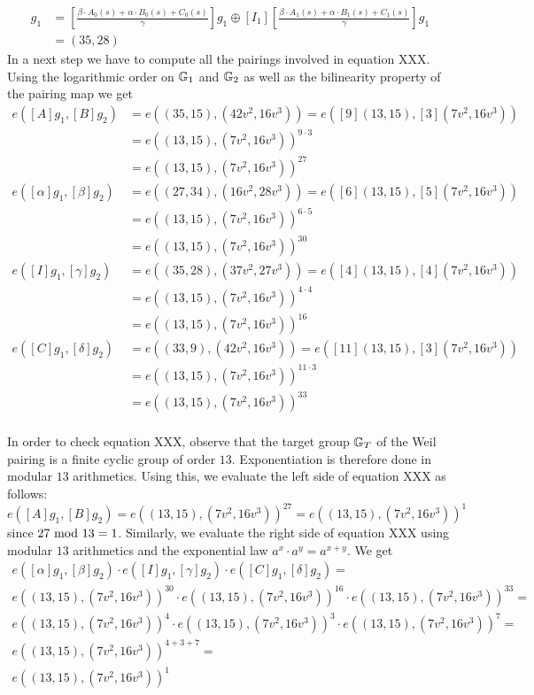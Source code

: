 \begin{example}
\begin{align*}
[I]g_1 & = [\frac{\beta\cdot A_{0}(s)+\alpha\cdot B_{0}(s)+C_{0}(s)}{\gamma}]g_1 \oplus [I_1][\frac{\beta\cdot A_{1}(s)+\alpha\cdot B_{1}(s)+C_{1}(s)}{\gamma}]g_1\\
       & = (35,28)
\end{align*} 
In a next step we have to compute all the pairings involved in equation XXX. Using the logarithmic order on $\mathbb{G}_1$ and $\mathbb{G}_2$ as well as the bilinearity property of the pairing map we get
\begin{align*}
e([A]g_1,[B]g_2) & = e((35,15),(42v^2,16v^3))
                   = e([9](13,15),[3](7v^2,16v^3))\\
               & = e((13,15),(7v^2,16v^3))^{9\cdot 3}\\ 
               & = e((13,15),(7v^2,16v^3))^{27}\\
e([\alpha]g_1,[\beta]g_2) & = e((27,34),(16v^2,28v^3)) 
                            = e([6](13,15),[5](7v^2,16v^3))\\
               & = e((13,15),(7v^2,16v^3))^{6\cdot 5}\\
               & = e((13,15),(7v^2,16v^3))^{30}\\   
e([I]g_1,[\gamma]g_2) & = e((35,28),(37v^2,27v^3)) 
                            = e([4](13,15),[4](7v^2,16v^3))\\
               & = e((13,15),(7v^2,16v^3))^{4\cdot 4}\\
               & = e((13,15),(7v^2,16v^3))^{16}\\ 
e([C]g_1,[\delta]g_2) & = e((33,9),(42v^2,16v^3)) 
                            = e([11](13,15),[3](7v^2,16v^3))\\
               & = e((13,15),(7v^2,16v^3))^{11\cdot 3}\\
               & = e((13,15),(7v^2,16v^3))^{33}\\                                             
\end{align*}  

In order to check equation XXX, observe that the target group $\mathbb{G}_T$ of the Weil pairing is a finite cyclic group of order $13$. Exponentiation is therefore done in modular $13$ arithmetics. Using this, we evaluate the left side of equation XXX as follows:
$$
e([A]g_1,[B]g_2) = e((13,15),(7v^2,16v^3))^{27} =e((13,15),(7v^2,16v^3))^{1}
$$
since $27 \text{ mod } 13=1$. Similarly, we evaluate the right side of equation XXX using modular $13$ arithmetics and the exponential law $a^x\cdot a^y = a^{x+y}$. We get
\begin{align*}
e([\alpha]g_1,[\beta]g_2)\cdot e([I]g_1,[\gamma]g_2)\cdot e([C]g_1,[\delta]g_2) =\\
e((13,15),(7v^2,16v^3))^{30}\cdot e((13,15),(7v^2,16v^3))^{16}\cdot e((13,15),(7v^2,16v^3))^{33} =\\
e((13,15),(7v^2,16v^3))^{4}\cdot e((13,15),(7v^2,16v^3))^{3}\cdot e((13,15),(7v^2,16v^3))^{7} =\\
e((13,15),(7v^2,16v^3))^{4+3+7} = \\
e((13,15),(7v^2,16v^3))^{1}
\end{align*}


\end{example}
